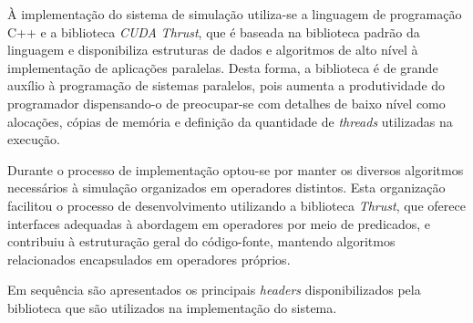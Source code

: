 À implementação do sistema de simulação utiliza-se a linguagem de programação C++ e a biblioteca \textit{CUDA} \textit{Thrust}, que é baseada na biblioteca padrão da linguagem e disponibiliza estruturas de dados e algoritmos de alto nível à implementação de aplicações paralelas. Desta forma, a biblioteca é de grande auxílio à programação de sistemas paralelos, pois aumenta a produtividade do programador dispensando-o de preocupar-se com detalhes de baixo nível como alocações, cópias de memória e definição da quantidade de \textit{threads} utilizadas na execução. 

Durante o processo de implementação optou-se por manter os diversos algoritmos necessários à simulação organizados em operadores distintos. Esta organização facilitou o processo de desenvolvimento utilizando a biblioteca \textit{Thrust}, que oferece interfaces adequadas à abordagem em operadores por meio de predicados, e contribuiu à estruturação geral do código-fonte, mantendo algoritmos relacionados encapsulados em operadores próprios. 

Em sequência são apresentados os principais \textit{headers} disponibilizados pela biblioteca que são utilizados na implementação do sistema. 

